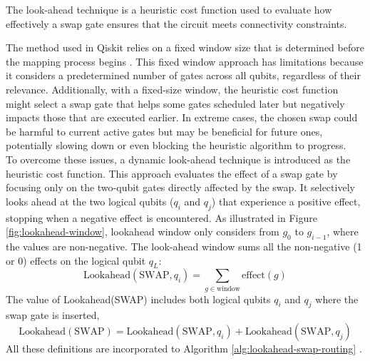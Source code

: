 \begin{definition}
    The look-ahead technique is a heuristic cost function used to evaluate how effectively a swap gate ensures that the circuit meets connectivity constraints.
\end{definition}
The method used in Qiskit relies on a fixed window size that is determined before the mapping process begins \cite{ibmquantum_lookaheadswap}. This fixed window approach has limitations because it considers a predetermined number of gates across all qubits, regardless of their relevance. Additionally, with a fixed-size window, the heuristic cost function might select a swap gate that helps some gates scheduled later but negatively impacts those that are executed earlier. In extreme cases, the chosen swap could be harmful to current active gates but may be beneficial for future ones, potentially slowing down or even blocking the heuristic algorithm to progress. \\
To overcome these issues, a dynamic look-ahead technique is introduced as the heuristic cost function. This approach evaluates the effect of a swap gate by focusing only on the two-qubit gates directly affected by the swap. It selectively looks ahead at the two logical qubits ($q_i$ and $q_j$) that experience a positive effect, stopping when a negative effect is encountered. As illustrated in Figure \ref{fig:lookahead-window}, lookahead window only considers from $g_0$ to $g_{i-1}$, where the values are non-negative. The look-ahead window sums all the non-negative (1 or 0) effects on the logical qubit $q_L$:
\begin{equation}
    \text{Lookahead}(\text{SWAP}, q_i) = \sum_{g \in \text{window}} \text{effect}(g)
\end{equation}
The value of Lookahead(SWAP) includes both logical qubits $q_i$ and $q_j$ where the swap gate is inserted,
\begin{equation}
    \text{Lookahead}(\text{SWAP}) = \text{Lookahead}(\text{SWAP}, q_i) + \text{Lookahead}(\text{SWAP}, q_j)
\end{equation}
All these definitions are incorporated to Algorithm \ref{alg:lookahead-swap-routing} .
